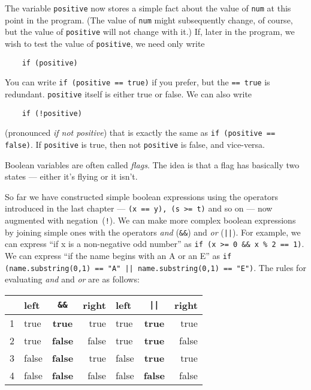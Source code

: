 The variable \texttt{positive} now stores a simple fact about the value of
 \texttt{num} at this point in the program.  (The value of  \texttt{num} might
subsequently change, of course, but the value of \texttt{positive} will not
change with it.)  If, later in the program, we wish to test
the value of \texttt{positive}, we need only write

\begin{Verbatim}
    if (positive)
\end{Verbatim}

You can write \texttt{if (positive == true)} if you prefer, but the
\texttt{== true} 
is redundant.  \texttt{positive} itself is either true or false.  
We can also write

\begin{Verbatim}
    if (!positive)
\end{Verbatim}

(pronounced \emph{if not positive}) that is exactly the same as \texttt{if
  (positive == false)}. If \texttt{positive} is true, then not
\texttt{positive} is false, and vice-versa. 

Boolean variables are often called \emph{flags}.  The idea is that
a flag has basically two states
--- either it's flying or it isn't.

So far we have constructed simple boolean expressions using the operators
introduced in the last chapter --- \texttt{(x == y), (s >= t)} and so on ---
now augmented with negation~(\verb+!+).
We can make more complex boolean expressions by joining simple ones
with the operators \emph{and} (\verb!&&!) and \emph{or} (\texttt{||}).  For example,
we can express ``if x is a non-negative odd number'' as
\verb+if (x >= 0 && x % 2 == 1)+. We can express ``if the name begins
with an A or an E'' as \texttt{if (name.substring(0,1) == "A" ||
  name.substring(0,1) == "E")}.  The rules for evaluating \emph{and}
and \emph{or} are as follows:

\vspace{1em}
\begin{tabular}{|l|lcr||lcr|}
\hline
& left & \verb!&&! & right & left & \verb+||+ & right\\
\hline
\hline
1 & true & \textbf{true} & true&true&\textbf{true}&true\\
2 & true & \textbf{false} & false&true&\textbf{true}&false\\
3 & false & \textbf{false} & true&false&\textbf{true}&true\\
4 & false & \textbf{false} & false&false&\textbf{false}&false\\
\hline
\end{tabular}
\vspace{1em}

